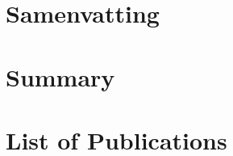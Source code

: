 \appendix


\backmatter


\chapter{Samenvatting}

\chapter{Summary}

\chapter{List of Publications}

\printbibliography

